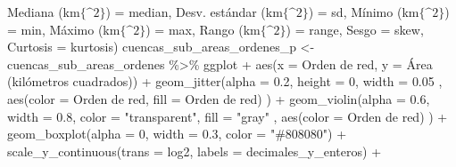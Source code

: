 \documentclass[spanish]{article}
\newenvironment{Shaded}{\begin{snugshade}}{\end{snugshade}}
\newcommand{\AttributeTok}[1]{\textcolor[rgb]{0.77,0.63,0.00}{#1}}
\newcommand{\DecValTok}[1]{\textcolor[rgb]{0.00,0.00,0.81}{#1}}
\newcommand{\FloatTok}[1]{\textcolor[rgb]{0.00,0.00,0.81}{#1}}
\newcommand{\FunctionTok}[1]{\textcolor[rgb]{0.00,0.00,0.00}{#1}}
\newcommand{\NormalTok}[1]{#1}
\newcommand{\OtherTok}[1]{\textcolor[rgb]{0.56,0.35,0.01}{#1}}
\newcommand{\SpecialCharTok}[1]{\textcolor[rgb]{0.00,0.00,0.00}{#1}}
\newcommand{\StringTok}[1]{\textcolor[rgb]{0.31,0.60,0.02}{#1}}
\begin{document}
\begin{Shaded}
\begin{Highlighting}[]
         \StringTok{\textasciigrave{}}\AttributeTok{Mediana (km$\{\^{}2\}$)}\StringTok{\textasciigrave{}} \OtherTok{=}\NormalTok{ median, }\StringTok{\textasciigrave{}}\AttributeTok{Desv. estándar (km$\{\^{}2\}$)}\StringTok{\textasciigrave{}} \OtherTok{=}\NormalTok{ sd,}
         \StringTok{\textasciigrave{}}\AttributeTok{Mínimo (km$\{\^{}2\}$)}\StringTok{\textasciigrave{}} \OtherTok{=}\NormalTok{ min, }\StringTok{\textasciigrave{}}\AttributeTok{Máximo (km$\{\^{}2\}$)}\StringTok{\textasciigrave{}} \OtherTok{=}\NormalTok{ max,}
         \StringTok{\textasciigrave{}}\AttributeTok{Rango (km$\{\^{}2\}$)}\StringTok{\textasciigrave{}} \OtherTok{=}\NormalTok{ range, }\AttributeTok{Sesgo =}\NormalTok{ skew,}
         \AttributeTok{Curtosis =}\NormalTok{ kurtosis)}
\NormalTok{cuencas\_sub\_areas\_ordenes\_p }\OtherTok{\textless{}{-}}\NormalTok{ cuencas\_sub\_areas\_ordenes }\SpecialCharTok{\%\textgreater{}\%}\NormalTok{ ggplot }\SpecialCharTok{+}
  \FunctionTok{aes}\NormalTok{(}\AttributeTok{x =} \StringTok{\textasciigrave{}}\AttributeTok{Orden de red}\StringTok{\textasciigrave{}}\NormalTok{, }\AttributeTok{y =} \StringTok{\textasciigrave{}}\AttributeTok{Área (kilómetros cuadrados)}\StringTok{\textasciigrave{}}\NormalTok{) }\SpecialCharTok{+}
  \FunctionTok{geom\_jitter}\NormalTok{(}\AttributeTok{alpha =} \FloatTok{0.2}\NormalTok{, }\AttributeTok{height =} \DecValTok{0}\NormalTok{, }\AttributeTok{width =} \FloatTok{0.05}
\NormalTok{              , }\FunctionTok{aes}\NormalTok{(}\AttributeTok{color =} \StringTok{\textasciigrave{}}\AttributeTok{Orden de red}\StringTok{\textasciigrave{}}\NormalTok{, }\AttributeTok{fill =} \StringTok{\textasciigrave{}}\AttributeTok{Orden de red}\StringTok{\textasciigrave{}}\NormalTok{)}
\NormalTok{              ) }\SpecialCharTok{+}
  \FunctionTok{geom\_violin}\NormalTok{(}\AttributeTok{alpha =} \FloatTok{0.6}\NormalTok{, }\AttributeTok{width =} \FloatTok{0.8}\NormalTok{, }\AttributeTok{color =} \StringTok{"transparent"}\NormalTok{, }\AttributeTok{fill =} \StringTok{"gray"}
\NormalTok{              , }\FunctionTok{aes}\NormalTok{(}\AttributeTok{color =} \StringTok{\textasciigrave{}}\AttributeTok{Orden de red}\StringTok{\textasciigrave{}}\NormalTok{)}
\NormalTok{              ) }\SpecialCharTok{+}
  \FunctionTok{geom\_boxplot}\NormalTok{(}\AttributeTok{alpha =} \DecValTok{0}\NormalTok{, }\AttributeTok{width =} \FloatTok{0.3}\NormalTok{, }\AttributeTok{color =} \StringTok{"\#808080"}\NormalTok{) }\SpecialCharTok{+}
  \FunctionTok{scale\_y\_continuous}\NormalTok{(}\AttributeTok{trans =} \StringTok{\textquotesingle{}log2\textquotesingle{}}\NormalTok{, }\AttributeTok{labels =}\NormalTok{ decimales\_y\_enteros) }\SpecialCharTok{+}

\end{Highlighting}
\end{Shaded}
\end{document}
